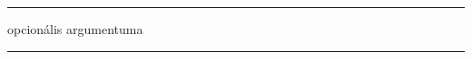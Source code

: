 \documentclass{article}
\begin{document}
\newenvironment{vonalzott}[1]
{\vspace{1ex}\hrule\vspace{1ex}
\begin{center}#1\end{center}}
{\vspace{1ex}\hrule\vspace{1ex}}
\parbox{0.8\linewidth}{
\begin{vonalzott}{opcionális argumentuma}
\hulipsum[1]
\end{vonalzott}}
\end{document}
